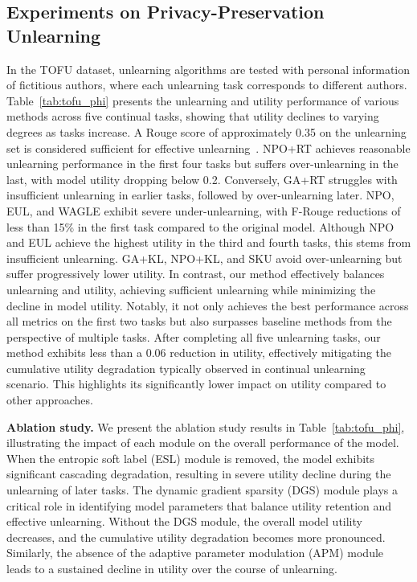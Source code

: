 \documentclass{article}
\theoremstyle{plain}
\theoremstyle{definition}
\theoremstyle{remark}
\begin{document}
\subsection{Experiments on Privacy-Preservation Unlearning}
In the TOFU dataset, unlearning algorithms are tested with personal information of fictitious authors, where each unlearning task corresponds to different authors. Table~\ref{tab:tofu_phi} presents the unlearning and utility performance of various methods across five continual tasks, showing that utility declines to varying degrees as tasks increase.
A Rouge score of approximately 0.35 on the unlearning set is considered sufficient for effective unlearning~\cite{DBLP:journals/corr/abs-2401-06121}.
NPO+RT achieves reasonable unlearning performance in the first four tasks but suffers over-unlearning in the last, with model utility dropping below 0.2.
Conversely, GA+RT struggles with insufficient unlearning in earlier tasks, followed by over-unlearning later.
NPO, EUL, and WAGLE exhibit severe under-unlearning, with F-Rouge reductions of less than 15\% in the first task compared to the original model.
Although NPO and EUL achieve the highest utility in the third and fourth tasks, this stems from insufficient unlearning.
GA+KL, NPO+KL, and SKU avoid over-unlearning but suffer progressively lower utility.
In contrast, our method effectively balances unlearning and utility, achieving sufficient unlearning while minimizing the decline in model utility.
Notably, it not only achieves the best performance across all metrics on the first two tasks but also surpasses baseline methods from the perspective of multiple tasks.
After completing all five unlearning tasks, our method exhibits less than a 0.06 reduction in utility, effectively mitigating the cumulative utility degradation typically observed in continual unlearning scenario. This highlights its significantly lower impact on utility compared to other approaches.


\textbf{Ablation study.} We present the ablation study results in Table~\ref{tab:tofu_phi}, illustrating the impact of each module on the overall performance of the model.
When the entropic soft label (ESL) module is removed, the model exhibits significant cascading degradation, resulting in severe utility decline during the unlearning of later tasks.
The dynamic gradient sparsity (DGS) module plays a critical role in identifying model parameters that balance utility retention and effective unlearning. Without the DGS module, the overall model utility decreases, and the cumulative utility degradation becomes more pronounced.
Similarly, the absence of the adaptive parameter modulation (APM) module leads to a sustained decline in utility over the course of unlearning.
\end{document}
